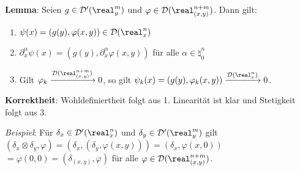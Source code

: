 \textbf{Lemma}:
Seien $g \in \D'(\real^m_y)$ und $\varphi \in \D(\real^{n+m}_{(x,y)})$.
Dann gilt:
\begin{enumerate}
    \item
    $\psi(x) = (g(y), \varphi(x, y)) \in \D(\real^n_x)$
    
    \item
    $\partial^\alpha_x \psi(x) = (g(y), \partial^\alpha_x \varphi(x, y))$
    für alle $\alpha \in \natural_0^n$
    
    \item
    Gilt $\varphi_k \xrightarrow{\D(\real^{n+m}_{(x,y)})} 0$, so gilt
    $\psi_k(x) = (g(y), \varphi_k(x, y)) \xrightarrow{\D(\real^n_x)} 0$.
\end{enumerate}

\textbf{Korrektheit}:
Wohldefiniertheit folgt aus 1.
Linearität ist klar und Stetigkeit folgt aus 3.

\emph{Beispiel}:
Für $\delta_x \in \D'(\real^n_x)$ und $\delta_y \in \D'(\real^m_y)$ gilt
$(\delta_x \otimes \delta_y, \varphi) = (\delta_x, (\delta_y, \varphi(x, y))) =
(\delta_x, \varphi(x, 0))$\\
$= \varphi(0, 0) = (\delta_{(x,y)}, \varphi)$
für alle $\varphi \in \D(\real^{n+m}_{(x,y)})$.

\linie

